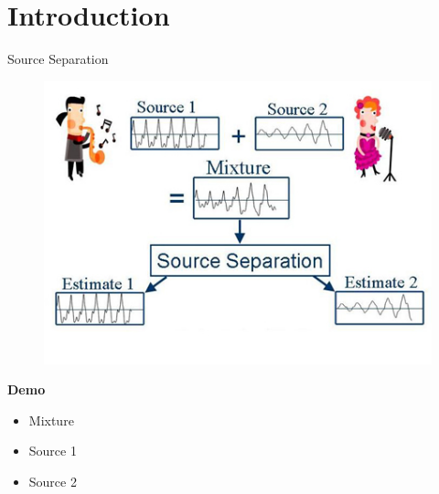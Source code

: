 \documentclass[xcolor=table,mathserif,9pt]{beamer}    %
\begin{document}
\section{Introduction}%
\label{sec:introduction}
\begin{frame}{Source Separation}

\begin{center}
	\begin{figure}
	\includegraphics[width=.6\textwidth]{images/separation_example.jpg}
	\end{figure}
\end{center}

\textbf{Demo} \cite{Demo}
\begin{itemize}
 	\item Mixture
	\item Source 1 
	\item Source 2 
\end{itemize}


\end{frame}
\end{document}
